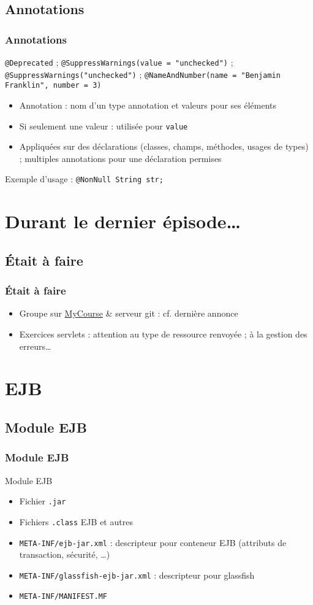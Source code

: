 \documentclass[english, french]{beamer}
\begin{document}
\subsection{Annotations}
\begin{frame}
	\frametitle{Annotations}
	\texttt{@Deprecated} ; \texttt{@SuppressWarnings(value = "unchecked")} ; \texttt{@SuppressWarnings("unchecked")} ; \texttt{@NameAndNumber(name = "Benjamin Franklin", number = 3)}
	\begin{itemize}
		\item Annotation : nom d’un type annotation et valeurs pour ses éléments
		\item Si seulement une valeur : utilisée pour \texttt{value}
		\item Appliquées sur des déclarations (classes, champs, méthodes, usages de types) ; multiples annotations pour une déclaration permises
	\end{itemize}
	Exemple d’usage : \texttt{@NonNull String str;}
\end{frame}

\section[Dernier épisode]{Durant le dernier épisode…}
\subsection{Était à faire}
\begin{frame}
	\frametitle{Était à faire}
	\begin{itemize}
		\item Groupe sur  \href{https://mycourse.dauphine.fr/webapps/blackboard/execute/courseMain?course_id=_34753_1}{MyCourse} \& serveur git : cf. dernière annonce
		\item Exercices servlets : attention au type de ressource renvoyée ; à la gestion des erreurs…
	\end{itemize}
\end{frame}

\section{EJB}
\subsection{Module EJB}
\begin{frame}
	\frametitle{Module EJB}
	\begin{block}{Module EJB}
		\begin{itemize}
			\item Fichier \texttt{.jar}
			\item Fichiers \texttt{.class} EJB et autres
			\item \texttt{META-INF/ejb-jar.xml} : descripteur pour conteneur EJB (attributs de transaction, sécurité, …)
			\item \texttt{META-INF/glassfish-ejb-jar.xml} : descripteur pour glassfish
			\item \texttt{META-INF/MANIFEST.MF}
		\end{itemize}
	\end{block}
\end{frame}
\end{document}

